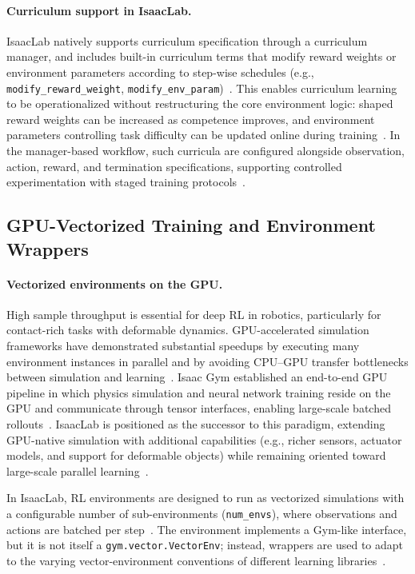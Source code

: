 \paragraph{Curriculum support in IsaacLab.}
IsaacLab natively supports curriculum specification through a curriculum manager, and includes built-in curriculum terms that modify reward weights or environment parameters according to step-wise schedules (e.g., \texttt{modify\_reward\_weight}, \texttt{modify\_env\_param})~\cite{isaaclab_mdp_terms_api}. This enables curriculum learning to be operationalized without restructuring the core environment logic: shaped reward weights can be increased as competence improves, and environment parameters controlling task difficulty can be updated online during training~\cite{isaaclab_mdp_terms_api,isaaclab_managers_api}. In the manager-based workflow, such curricula are configured alongside observation, action, reward, and termination specifications, supporting controlled experimentation with staged training protocols~\cite{isaaclab_task_design_workflows,nvidia_isaaclab_mdp_managers_getting_started}.

\subsection{GPU-Vectorized Training and Environment Wrappers}

\paragraph{Vectorized environments on the GPU.}
High sample throughput is essential for deep \ac{RL} in robotics, particularly for contact-rich tasks with deformable dynamics. GPU-accelerated simulation frameworks have demonstrated substantial speedups by executing many environment instances in parallel and by avoiding CPU--GPU transfer bottlenecks between simulation and learning~\cite{Makoviychuk2021IsaacGym,NVIDIA2025IsaacLab}. Isaac Gym established an end-to-end GPU pipeline in which physics simulation and neural network training reside on the GPU and communicate through tensor interfaces, enabling large-scale batched rollouts~\cite{Makoviychuk2021IsaacGym}. IsaacLab is positioned as the successor to this paradigm, extending GPU-native simulation with additional capabilities (e.g., richer sensors, actuator models, and support for deformable objects) while remaining oriented toward large-scale parallel learning~\cite{NVIDIA2025IsaacLab}.

In IsaacLab, \ac{RL} environments are designed to run as vectorized simulations with a configurable number of sub-environments (\texttt{num\_envs}), where observations and actions are batched per step~\cite{isaaclab_envs_api}. The environment implements a Gym-like interface, but it is not itself a \texttt{gym.vector.VectorEnv}; instead, wrappers are used to adapt to the varying vector-environment conventions of different learning libraries~\cite{isaaclab_envs_api,isaaclab_training_rl_agent}.

